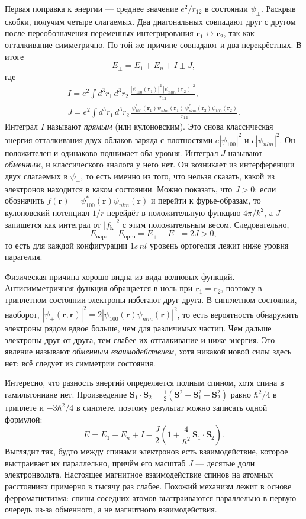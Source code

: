 Первая поправка к энергии --- среднее значение $e^2/r_{12}$ в состоянии
$\psi_\pm$. Раскрыв скобки, получим четыре слагаемых. Два диагональных
совпадают друг с другом после переобозначения переменных интегрирования
$\mathbf{r}_1 \leftrightarrow \mathbf{r}_2$, так как отталкивание симметрично.
По той же причине совпадают и два перекрёстных. В итоге
\[
  E_\pm = E_1 + E_n + I \pm J,
\]
где
\begin{gather*}
  I = e^2\int d^3r_1\,d^3r_2\,
  \frac{|\psi_{100}(\mathbf{r}_1)|^2\,|\psi_{nlm}(\mathbf{r}_2)|^2}{r_{12}},\\
  J = e^2\int d^3r_1\,d^3r_2\,
  \frac{\psi_{100}^*(\mathbf{r}_1)\psi_{nlm}(\mathbf{r}_1)\,
    \psi_{nlm}^*(\mathbf{r}_2)\psi_{100}(\mathbf{r}_2)}{r_{12}}.
\end{gather*}
Интеграл $I$ называют \textit{прямым} (или кулоновским). Это снова классическая
энергия отталкивания двух облаков заряда с плотностями $e|\psi_{100}|^2$ и
$e|\psi_{nlm}|^2$. Он положителен и одинаково поднимает оба уровня. Интеграл
$J$ называют \textit{обменным}, и классического аналога у него нет. Он
возникает из интерференции двух слагаемых в $\psi_\pm$, то есть именно из того,
что нельзя сказать, какой из электронов находится в каком состоянии. Можно
показать, что $J > 0$: если обозначить $f(\mathbf{r}) =
  \psi_{100}^*(\mathbf{r})\psi_{nlm}(\mathbf{r})$ и перейти к фурье-образам, то
кулоновский потенциал $1/r$ перейдёт в положительную функцию $4\pi/k^2$, а $J$
запишется как интеграл от $|f_{\mathbf{k}}|^2$ с этим положительным весом.
Следовательно,
\[
  E_{\text{пара}} - E_{\text{орто}} = E_+ - E_- = 2J > 0,
\]
то есть для каждой конфигурации $1s\,nl$ уровень ортогелия лежит ниже уровня
парагелия.

Физическая причина хорошо видна из вида волновых функций. Антисимметричная
функция обращается в ноль при $\mathbf{r}_1 = \mathbf{r}_2$, поэтому в
триплетном состоянии электроны избегают друг друга. В синглетном состоянии,
наоборот, $|\psi_+(\mathbf{r}, \mathbf{r})|^2 =
  2|\psi_{100}(\mathbf{r})\psi_{nlm}(\mathbf{r})|^2$, то есть вероятность
обнаружить электроны рядом вдвое больше, чем для различимых частиц. Чем дальше
электроны друг от друга, тем слабее их отталкивание и ниже энергия. Это явление
называют \textit{обменным взаимодействием}, хотя никакой новой силы здесь нет:
всё следует из симметрии состояния.

Интересно, что разность энергий определяется полным спином, хотя спина в
гамильтониане нет. Произведение $\mathbf{S}_1\cdot\mathbf{S}_2 =
  \frac{1}{2}(\mathbf{S}^2 - \mathbf{S}_1^2 - \mathbf{S}_2^2)$ равно $\hbar^2/4$
в триплете и $-3\hbar^2/4$ в синглете, поэтому результат можно записать одной
формулой:
\[
  E = E_1 + E_n + I - \frac{J}{2}\left(1 +
  \frac{4}{\hbar^2}\,\mathbf{S}_1\cdot\mathbf{S}_2\right).
\]
Выглядит так, будто между спинами электронов есть взаимодействие, которое
выстраивает их параллельно, причём его масштаб $J$ --- десятые доли
электронвольта. Настоящее магнитное взаимодействие спинов на атомных
расстояниях примерно в тысячу раз слабее. Похожий механизм лежит в основе
ферромагнетизма: спины соседних атомов выстраиваются параллельно в первую
очередь из-за обменного, а не магнитного взаимодействия.
